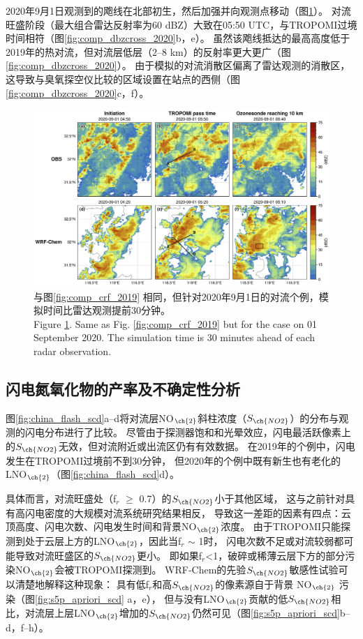 2020年9月1日观测到的飑线在北部初生，然后加强并向观测点移动（图\ref{fig:comp_crf_2020}）。
对流旺盛阶段（最大组合雷达反射率为60 dBZ）大致在05:50 UTC，与TROPOMI过境时间相符（图\ref{fig:comp_dbzcross_2020}b，e）。
虽然该飑线抵达的最高高度低于2019年的热对流，但对流层低层（2--8 km）的反射率更大更广（图\ref{fig:comp_dbzcross_2020}）。
由于模拟的对流消散区偏离了雷达观测的消散区，这导致与臭氧探空仪比较的区域设置在站点的西侧（图\ref{fig:comp_dbzcross_2020}c，f）。


\begin{figure}[H]
\centering
\includegraphics[width=\textwidth]{./figures/comp_crf_2020.png}
\caption{与图\ref{fig:comp_crf_2019} 相同，但针对2020年9月1日的对流个例，模拟时间比雷达观测提前30分钟。\\
Figure \ref{fig:comp_crf_2020}. Same as Fig. \ref{fig:comp_crf_2019} but for the case on 01 September 2020.
The simulation time is 30 minutes ahead of each radar observation.}
\label{fig:comp_crf_2020}
\end{figure}

\subsection{闪电氮氧化物的产率及不确定性分析}


图\ref{fig:china_flash_scd}a--d将对流层NO$_{\ch{2}}$斜柱浓度（$S_{\ch{NO2}}$）的分布与观测的闪电分布进行了比较。
尽管由于探测器饱和和光晕效应，闪电最活跃像素上的$S_{\ch{NO2}}$无效，但对流附近或出流区仍有有效数据。
在2019年的个例中，闪电发生在TROPOMI过境前不到30分钟，
但2020年的个例中既有新生也有老化的LNO$_{\ch{2}}$（图\ref{fig:china_flash_scd}d）。

具体而言，对流旺盛处（f$_r$ $\geq$ 0.7）的$S_{\ch{NO2}}$小于其他区域，
这与之前针对具有高闪电密度的大规模对流系统研究结果相反\citep{Beirle.2009}，
导致这一差距的因素有四点：云顶高度、闪电次数、闪电发生时间和背景NO$_{\ch{2}}$浓度。
由于TROPOMI只能探测到处于云层上方的LNO$_{\ch{2}}$，因此当f$_r$ $\sim$ 1时，
闪电次数不足或对流较弱都可能导致对流旺盛区的$S_{\ch{NO2}}$更小。
即如果f$_r$<1，破碎或稀薄云层下方的部分污染NO$_{\ch{2}}$会被TROPOMI探测到。
WRF-Chem的先验$S_{\ch{NO2}}$敏感性试验可以清楚地解释这种现象：
具有低f$_r$和高$S_{\ch{NO2}}$的像素源自于背景 NO$_{\ch{2}}$ 污染（图\ref{fig:s5p_apriori_scd} a，e），
但与没有LNO$_{\ch{2}}$贡献的低$S_{\ch{NO2}}$相比，对流层上层LNO$_{\ch{2}}$增加的$S_{\ch{NO2}}$仍然可见（图\ref{fig:s5p_apriori_scd}b--d，f--h）。


